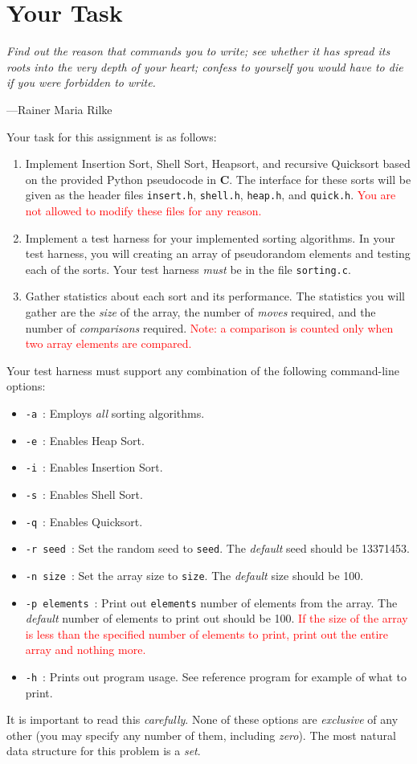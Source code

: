 \section{Your Task}\label{task}

\epigraph{\emph{Find out the reason that commands you to write; see whether it has spread its roots into the very depth of your heart; confess to yourself you would have to die if you were forbidden to write.}}{---Rainer Maria Rilke}

\noindent Your task for this assignment is as follows:

\begin{enumerate}
  \item Implement Insertion Sort, Shell Sort, Heapsort, and recursive
    Quicksort based on the provided Python pseudocode in \textbf{C}. The
    interface for these sorts will be given as the header files
    \texttt{insert.h}, \texttt{shell.h}, \texttt{heap.h}, and
    \texttt{quick.h}. \textcolor{red}{You are not allowed to modify
    these files for any reason.}
  \item Implement a test harness for your implemented sorting
    algorithms. In your test harness, you will creating an array of
    pseudorandom elements and testing each of the sorts. Your test harness
    \emph{must} be in the file \texttt{sorting.c}.
  \item Gather statistics about each sort and its performance. The
    statistics you will gather are the \emph{size} of the array, the
    number of \emph{moves} required, and the number of
    \emph{comparisons} required. \textcolor{red}{Note: a comparison is
    counted only when two array elements are compared.}
\end{enumerate}

Your test harness must support any combination of the following
command-line options:

\begin{itemize}
  \item \texttt{-a}\ : Employs \emph{all} sorting algorithms.
  \item \texttt{-e}\ : Enables Heap Sort.
  \item \texttt{-i}\ : Enables Insertion Sort.
  \item \texttt{-s}\ : Enables Shell Sort.
  \item \texttt{-q}\ : Enables Quicksort.
  \item \texttt{-r seed}\ : Set the random seed to \texttt{seed}.
    The \emph{default} seed should be 13371453.
  \item \texttt{-n size}\ : Set the array size to \texttt{size}. The
    \emph{default} size should be 100.
  \item \texttt{-p elements}\ : Print out \texttt{elements} number of
    elements from the array. The \emph{default} number of elements to
    print out should be 100. \textcolor{red}{If the size of the array is
      less than the specified number of elements to print, print out the
    entire array and nothing more.}
  \item \texttt{-h}\ : Prints out program usage. See reference program
    for example of what to print.
\end{itemize}

It is important to read this \emph{carefully}. None of these options are
\emph{exclusive} of any other (you may specify any number of them,
including \emph{zero}). The most natural data structure for this
problem is a \emph{set}.

